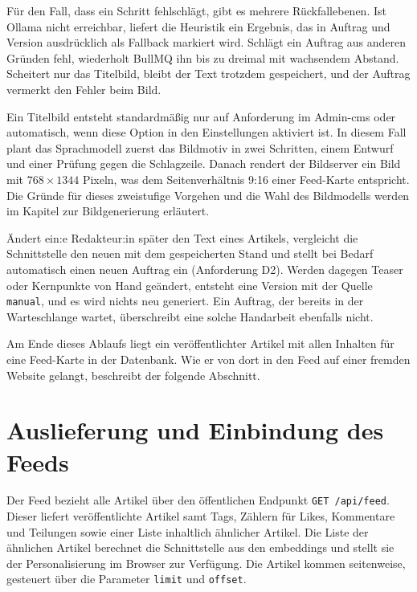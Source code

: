 Für den Fall, dass ein Schritt fehlschlägt, gibt es mehrere Rückfallebenen.
Ist Ollama nicht erreichbar, liefert die Heuristik ein Ergebnis, das in Auftrag und Version ausdrücklich als Fallback markiert wird.
Schlägt ein Auftrag aus anderen Gründen fehl, wiederholt BullMQ ihn bis zu dreimal mit wachsendem Abstand.
Scheitert nur das Titelbild, bleibt der Text trotzdem gespeichert, und der Auftrag vermerkt den Fehler beim Bild.

Ein Titelbild entsteht standardmäßig nur auf Anforderung im Admin-\gls{cms} oder automatisch, wenn diese Option in den Einstellungen aktiviert ist.
In diesem Fall plant das Sprachmodell zuerst das Bildmotiv in zwei Schritten, einem Entwurf und einer Prüfung gegen die Schlagzeile.
Danach rendert der Bildserver ein Bild mit $768 \times 1344$ Pixeln, was dem Seitenverhältnis 9:16 einer Feed-Karte entspricht.
Die Gründe für dieses zweistufige Vorgehen und die Wahl des Bildmodells werden im Kapitel zur Bildgenerierung erläutert.

Ändert ein:e Redakteur:in später den Text eines Artikels, vergleicht die Schnittstelle den neuen mit dem gespeicherten Stand und stellt bei Bedarf automatisch einen neuen Auftrag ein (Anforderung D2).
Werden dagegen Teaser oder Kernpunkte von Hand geändert, entsteht eine Version mit der Quelle \texttt{manual}, und es wird nichts neu generiert.
Ein Auftrag, der bereits in der Warteschlange wartet, überschreibt eine solche Handarbeit ebenfalls nicht.

Am Ende dieses Ablaufs liegt ein veröffentlichter Artikel mit allen Inhalten für eine Feed-Karte in der Datenbank.
Wie er von dort in den Feed auf einer fremden Website gelangt, beschreibt der folgende Abschnitt.

\section{Auslieferung und Einbindung des Feeds}\label{sec:arch:delivery}
\setauthor{\secondauthor}

Der Feed bezieht alle Artikel über den öffentlichen Endpunkt \texttt{GET /api/feed}.
Dieser liefert veröffentlichte Artikel samt Tags, Zählern für Likes, Kommentare und Teilungen sowie einer Liste inhaltlich ähnlicher Artikel.
Die Liste der ähnlichen Artikel berechnet die Schnittstelle aus den \glspl{embedding} und stellt sie der Personalisierung im Browser zur Verfügung.
Die Artikel kommen seitenweise, gesteuert über die Parameter \texttt{limit} und \texttt{offset}.

